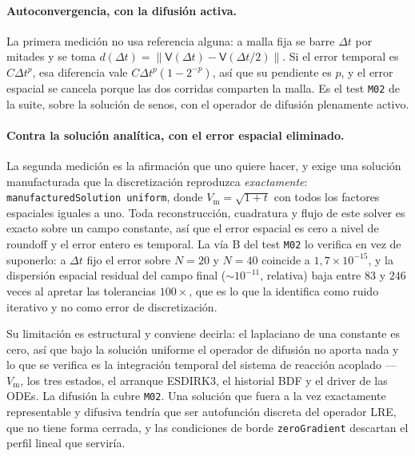\documentclass[11pt,a4paper]{article}
\newcommand{\code}[1]{\texttt{\small #1}}
\newcommand{\Vm}{V_{\text{m}}}
\begin{document}
\paragraph{Autoconvergencia, con la difusión activa.} La primera medición no usa
referencia alguna: a malla fija se barre $\Delta t$ por mitades y se toma
$d(\Delta t)=\|\mathsf{V}(\Delta t)-\mathsf{V}(\Delta t/2)\|$. Si el error
temporal es $C\Delta t^p$, esa diferencia vale $C\Delta t^p(1-2^{-p})$, así que su
pendiente es $p$, y el error espacial se cancela porque las dos corridas
comparten la malla. Es el test \code{M02} de la suite, sobre la solución de
senos, con el operador de difusión plenamente activo.

\paragraph{Contra la solución analítica, con el error espacial eliminado.} La
segunda medición es la afirmación que uno quiere hacer, y exige una solución
manufacturada que la discretización reproduzca \emph{exactamente}:
\code{manufacturedSolution uniform}, donde $\Vm=\sqrt{1+t}$ con todos los
factores espaciales iguales a uno. Toda reconstrucción, cuadratura y flujo de
este solver es exacto sobre un campo constante, así que el error espacial es cero
a nivel de roundoff y el error entero es temporal. La vía B del test \code{M02} lo verifica
en vez de suponerlo: a $\Delta t$ fijo el error sobre $N=20$ y $N=40$ coincide a
$1{,}7\times10^{-15}$, y la dispersión espacial residual del campo final
($\sim10^{-11}$, relativa) baja entre $83$ y $246$ veces al apretar las
tolerancias $100\times$, que es lo que la identifica como ruido iterativo y no
como error de discretización.

Su limitación es estructural y conviene decirla: el laplaciano de una constante
es cero, así que bajo la solución uniforme el operador de difusión no aporta nada
y lo que se verifica es la integración temporal del sistema de reacción acoplado
--- $\Vm$, los tres estados, el arranque ESDIRK3, el historial BDF y el driver de
las ODEs. La difusión la cubre \code{M02}. Una solución que fuera a la vez
exactamente representable y difusiva tendría que ser autofunción discreta del
operador LRE, que no tiene forma cerrada, y las condiciones de borde
\code{zeroGradient} descartan el perfil lineal que serviría.
\end{document}
